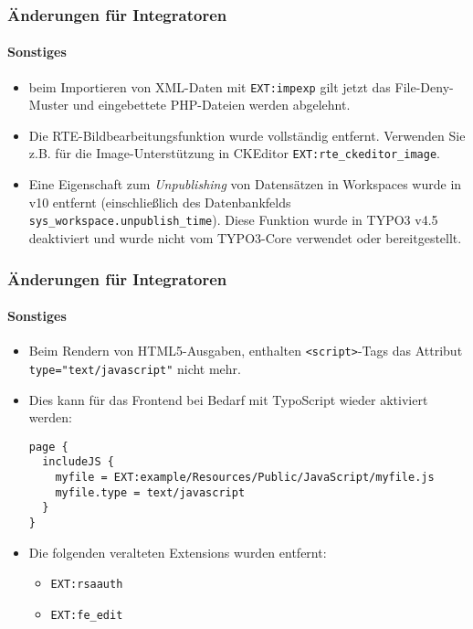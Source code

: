 \begin{frame}[fragile]
	\frametitle{Änderungen für Integratoren}
	\framesubtitle{Sonstiges}

	\lstset{basicstyle=\tiny\ttfamily}

	\begin{itemize}

		\item beim Importieren von XML-Daten mit \texttt{EXT:impexp} gilt jetzt das File-Deny-Muster und 
			eingebettete PHP-Dateien werden abgelehnt.

		\item Die RTE-Bildbearbeitungsfunktion wurde vollständig entfernt.
			Verwenden Sie z.B. für die Image-Unterstützung in CKEditor 
			\texttt{EXT:rte\_ckeditor\_image}.

		\item Eine Eigenschaft zum \textit{Unpublishing} von Datensätzen in Workspaces wurde in v10 entfernt
			(einschließlich des Datenbankfelds \texttt{sys\_workspace.unpublish\_time}). Diese Funktion wurde in TYPO3 v4.5 deaktiviert und wurde nicht vom TYPO3-Core verwendet oder bereitgestellt.

	\end{itemize}

\end{frame}


\begin{frame}[fragile]
	\frametitle{Änderungen für Integratoren}
	\framesubtitle{Sonstiges}

	\lstset{basicstyle=\tiny\ttfamily}

	\begin{itemize}

		\item Beim Rendern von HTML5-Ausgaben,  enthalten \texttt{<script>}-Tags 
			das Attribut \texttt{type="text/javascript"} nicht mehr.

		\item Dies kann für das Frontend bei Bedarf mit TypoScript wieder aktiviert werden:

\begin{lstlisting}
page {
  includeJS {
    myfile = EXT:example/Resources/Public/JavaScript/myfile.js
    myfile.type = text/javascript
  }
}
\end{lstlisting}

		\item Die folgenden veralteten Extensions wurden entfernt:

			\begin{itemize}
				\item \texttt{EXT:rsaauth}
				\item \texttt{EXT:fe\_edit}
			\end{itemize}

	\end{itemize}

\end{frame}

